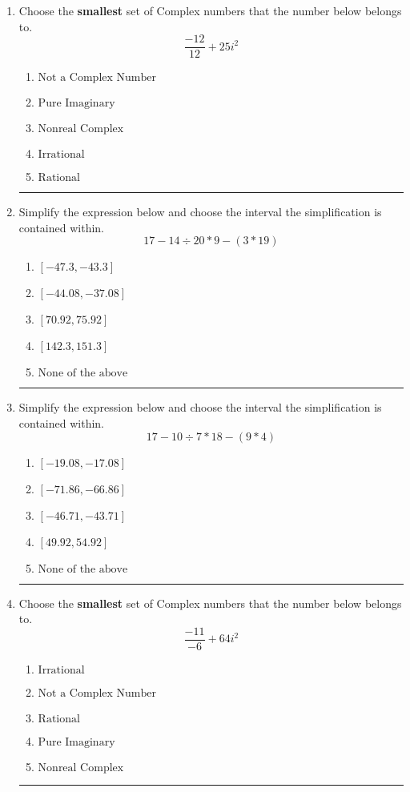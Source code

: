 \documentclass[14pt]{extbook}
\newcommand{\litem}[1]{\item#1\hspace*{-1cm}\rule{\textwidth}{0.4pt}}
\begin{document}
\begin{enumerate}
{\begin{enumerate}[label=\Alph*.]
\end{enumerate} }
\litem{
Choose the \textbf{smallest} set of Complex numbers that the number below belongs to.\[ \frac{-12}{12}+25i^2 \]\begin{enumerate}[label=\Alph*.]
\item \( \text{Not a Complex Number} \)
\item \( \text{Pure Imaginary} \)
\item \( \text{Nonreal Complex} \)
\item \( \text{Irrational} \)
\item \( \text{Rational} \)

\end{enumerate} }
\litem{
Simplify the expression below and choose the interval the simplification is contained within.\[ 17 - 14 \div 20 * 9 - (3 * 19) \]\begin{enumerate}[label=\Alph*.]
\item \( [-47.3, -43.3] \)
\item \( [-44.08, -37.08] \)
\item \( [70.92, 75.92] \)
\item \( [142.3, 151.3] \)
\item \( \text{None of the above} \)

\end{enumerate} }
\litem{
Simplify the expression below and choose the interval the simplification is contained within.\[ 17 - 10 \div 7 * 18 - (9 * 4) \]\begin{enumerate}[label=\Alph*.]
\item \( [-19.08, -17.08] \)
\item \( [-71.86, -66.86] \)
\item \( [-46.71, -43.71] \)
\item \( [49.92, 54.92] \)
\item \( \text{None of the above} \)

\end{enumerate} }
\litem{
Choose the \textbf{smallest} set of Complex numbers that the number below belongs to.\[ \frac{-11}{-6}+64i^2 \]\begin{enumerate}[label=\Alph*.]
\item \( \text{Irrational} \)
\item \( \text{Not a Complex Number} \)
\item \( \text{Rational} \)
\item \( \text{Pure Imaginary} \)
\item \( \text{Nonreal Complex} \)


\end{enumerate}}
\end{enumerate}
\end{document}
